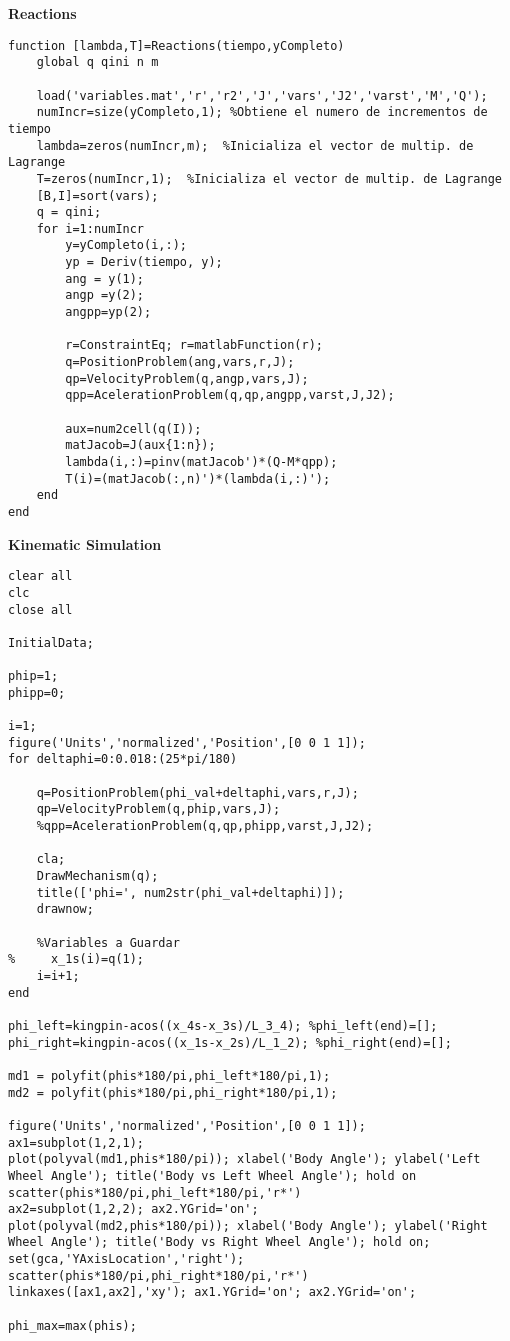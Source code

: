 \textbf{Reactions}
\begin{lstlisting}[style=codematlab]
function [lambda,T]=Reactions(tiempo,yCompleto)
    global q qini n m
    
    load('variables.mat','r','r2','J','vars','J2','varst','M','Q');
    numIncr=size(yCompleto,1); %Obtiene el numero de incrementos de tiempo 
    lambda=zeros(numIncr,m);  %Inicializa el vector de multip. de Lagrange
    T=zeros(numIncr,1);  %Inicializa el vector de multip. de Lagrange
    [B,I]=sort(vars);
    q = qini;
    for i=1:numIncr  
        y=yCompleto(i,:); 
        yp = Deriv(tiempo, y); 
        ang = y(1);  
        angp =y(2);  
        angpp=yp(2); 
        
        r=ConstraintEq; r=matlabFunction(r);
        q=PositionProblem(ang,vars,r,J);
        qp=VelocityProblem(q,angp,vars,J);
        qpp=AcelerationProblem(q,qp,angpp,varst,J,J2);
        
        aux=num2cell(q(I));
        matJacob=J(aux{1:n});
        lambda(i,:)=pinv(matJacob')*(Q-M*qpp); 
        T(i)=(matJacob(:,n)')*(lambda(i,:)');
    end
end
\end{lstlisting}

\newpage
\textbf{Kinematic Simulation}
\begin{lstlisting}[style=codematlab]
clear all
clc
close all

InitialData;

phip=1;
phipp=0;

i=1;
figure('Units','normalized','Position',[0 0 1 1]);
for deltaphi=0:0.018:(25*pi/180)
    
    q=PositionProblem(phi_val+deltaphi,vars,r,J);
    qp=VelocityProblem(q,phip,vars,J);
    %qpp=AcelerationProblem(q,qp,phipp,varst,J,J2);
    
    cla;
    DrawMechanism(q);
    title(['phi=', num2str(phi_val+deltaphi)]);
    drawnow;
    
    %Variables a Guardar
%     x_1s(i)=q(1);
    i=i+1;
end
 
phi_left=kingpin-acos((x_4s-x_3s)/L_3_4); %phi_left(end)=[];
phi_right=kingpin-acos((x_1s-x_2s)/L_1_2); %phi_right(end)=[];

md1 = polyfit(phis*180/pi,phi_left*180/pi,1);
md2 = polyfit(phis*180/pi,phi_right*180/pi,1);

figure('Units','normalized','Position',[0 0 1 1]);
ax1=subplot(1,2,1);
plot(polyval(md1,phis*180/pi)); xlabel('Body Angle'); ylabel('Left Wheel Angle'); title('Body vs Left Wheel Angle'); hold on
scatter(phis*180/pi,phi_left*180/pi,'r*')
ax2=subplot(1,2,2); ax2.YGrid='on';
plot(polyval(md2,phis*180/pi)); xlabel('Body Angle'); ylabel('Right Wheel Angle'); title('Body vs Right Wheel Angle'); hold on; set(gca,'YAxisLocation','right');
scatter(phis*180/pi,phi_right*180/pi,'r*')
linkaxes([ax1,ax2],'xy'); ax1.YGrid='on'; ax2.YGrid='on';
 
phi_max=max(phis);
\end{lstlisting}

